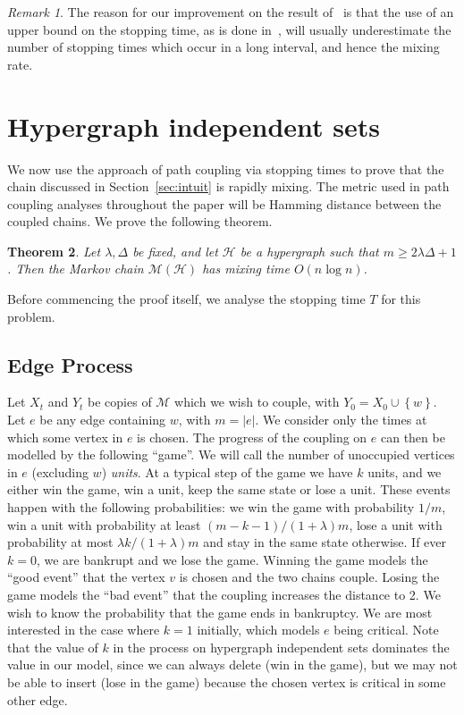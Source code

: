 \documentclass[11pt]{article}
\newtheorem{thm}{Theorem}[section]
\theoremstyle{definition}
\theoremstyle{remark}
\newtheorem{rem}[thm]{Remark}
\newcommand{\set}[1]{\left\{#1\right\}}
\newcommand{\M}{\mathcal{M}}
\newcommand{\CH}{\mathcal{H}}
\begin{document}
\begin{rem}
The reason for our improvement on the result of~\cite{HV04} is that the
use of an upper bound on the stopping time, as is done in~\cite{HV04},
will usually underestimate the number of stopping times which occur
in a long interval, and hence the mixing rate.
\end{rem}

\section{Hypergraph independent sets}\label{sec:indsets}

We now use the approach of path coupling via stopping times to prove that
the chain discussed in Section~\ref{sec:intuit} is rapidly mixing. The
metric used in path coupling analyses throughout the paper will be Hamming
distance between the coupled chains. We prove the following theorem.

\begin{thm}\label{indsets}
Let $\lambda,\Delta$ be fixed, and let $\CH$ be a hypergraph such that
$m\geq 2\lambda\Delta+1$. Then the Markov chain $\M(\CH)$ has mixing time
$O(n\log n)$.
\end{thm}
Before commencing the proof itself, we analyse the stopping time
$T$ for this problem.


\subsection{Edge Process}\label{edge}
Let $X_t$ and $Y_t$ be copies of $\M$ which we wish to couple, with
$Y_0=X_0\cup\set{w}$. Let $e$ be any edge containing $w$, with $m=|e|$. We
consider only the times at which some vertex in $e$ is chosen. The progress
of the coupling on $e$ can then be modelled by the following ``game''. We
will call the number of unoccupied vertices in $e$ (excluding $w$)
\emph{units}. At a typical step of the game we have $k$ units, and we
either win the game, win a unit, keep the same state or lose a unit. These
events happen with the following probabilities: we win the game with
probability $1/m$, win a unit with probability at least
$(m-k-1)/(1+\lambda)m$, lose a unit with probability at most $\lambda
k/(1+\lambda)m$ and stay in the same state otherwise. If ever $k=0$, we are
bankrupt and we lose the game. Winning the game models the ``good event''
that the vertex $v$ is chosen and the two chains couple. Losing the game
models the ``bad event'' that the coupling increases the distance to 2. We
wish to know the probability that the game ends in bankruptcy. We are most
interested in the case where $k=1$ initially, which models $e$ being
critical. Note that the value of $k$ in the process on hypergraph
independent sets dominates the value in our model, since we can always
delete (win in the game), but we may not be able to insert (lose in the
game) because the chosen vertex is critical in some other edge.
\end{document}
